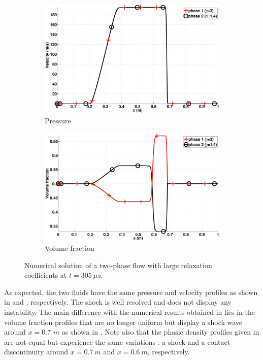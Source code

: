 \documentclass[preprint,10pt]{elsarticle}
\begin{document}
\begin{figure}[H]
        \begin{subfigure}[b]{0.495\textwidth}
                \centering
                \includegraphics[width=\textwidth]{figures/relaxation_two_phases_velocity.eps}
                \caption{Pressure}
                \label{fig:inf-rel-press}
        \end{subfigure}        
        \begin{subfigure}[b]{0.495\textwidth}
                \centering
                \includegraphics[width=\textwidth]{figures/relaxation_two_phases_volume_fraction.eps}
                \caption{Volume fraction}
                \label{fig:inf-rel-vf}
        \end{subfigure}
        \caption{Numerical solution of a two-phase flow with large relaxation coefficients at $t=305 \ \mu s$.}\label{fig:inf-rel-variables}
\end{figure}
%
As expected, the two fluids have the same pressure and velocity profiles as shown in  and , respectively. The shock is well resolved and does not display any instability. The main difference with the numerical results obtained in  lies in the volume fraction profiles that are no longer uniform but display a shock wave around $x=0.7$ $m$ as shown in . Note also that the phasic density profiles given in  are not equal but experience the same variations : a shock and a contact discontinuity around $x=0.7 \ m$ and $x = 0.6 \ m$, respectively. 
\end{document}
